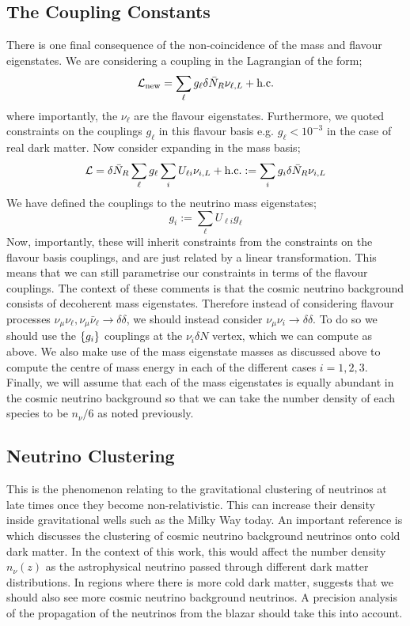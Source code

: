 \subsection{The Coupling Constants}


There is one final consequence of the non-coincidence of the mass and flavour eigenstates. We are considering a coupling in the Lagrangian of the form;
\begin{equation}
  \mathcal{L}_{\textrm{new}} = \sum_{\ell}{g_\ell \delta \bar{N}_R \nu_{\ell, L} + \textrm{h.c.}}
\end{equation}
where importantly, the $\nu_{\ell}$ are the flavour eigenstates. Furthermore, we quoted constraints on the couplings $g_\ell$ in this flavour basis e.g. $g_{\ell} < 10^{-3}$ in the case of real dark matter. Now consider expanding in the mass basis;
\begin{equation}
  \mathcal{L} = \delta \bar{N}_R \sum_{\ell}{g_\ell \sum_{i}{U_{\ell i}\nu_{i, L}}} + \textrm{h.c.} := \sum_i{g_i \delta \bar{N}_R \nu_{i, L}}
\end{equation}
We have defined the couplings to the neutrino mass eigenstates;
\begin{equation}
  g_i := \sum_{\ell}{U_{\ell i}g_{\ell}}
\end{equation}
Now, importantly, these will inherit constraints from the constraints on the flavour basis couplings, and are just related by a linear transformation. This means that we can still parametrise our constraints in terms of the flavour couplings. The context of these comments is that the cosmic neutrino background consists of decoherent mass eigenstates. Therefore instead of considering flavour processes $\nu_\mu \nu_\ell, \nu_\mu \bar{\nu}_\ell \rightarrow \delta\delta$, we should instead consider $\nu_\mu \nu_i \rightarrow \delta \delta$. To do so we should use the $\left\{g_i\right\}$ couplings at the $\nu_i \delta N$ vertex, which we can compute as above. We also make use of the mass eigenstate masses as discussed above to compute the centre of mass energy in each of the different cases $i = 1,2,3$. Finally, we will assume that each of the mass eigenstates is equally abundant in the cosmic neutrino background so that we can take the number density of each species to be $n_\nu/6$ as noted previously.

\subsection{Neutrino Clustering}


This is the phenomenon relating to the gravitational clustering of neutrinos at late times once they become non-relativistic. This can increase their density inside gravitational wells such as the Milky Way today.  An important reference is \cite{Ringwald2004} which discusses the clustering of cosmic neutrino background neutrinos onto cold dark matter. In the context of this work, this would affect the number density $n_\nu(z)$ as the astrophysical neutrino passed through different dark matter distributions. In regions where there is more cold dark matter, \cite{Ringwald2004} suggests that we should also see more cosmic neutrino background neutrinos. A precision analysis of the propagation of the neutrinos from the blazar should take this into account.

